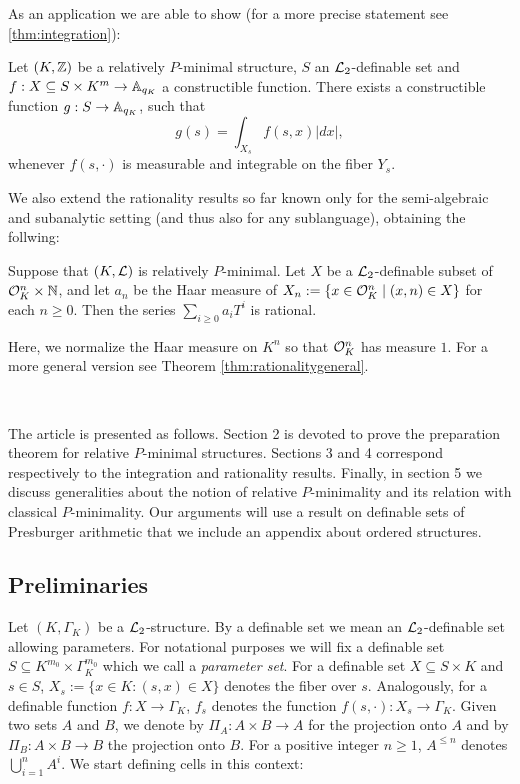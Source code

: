 As an application we are able to show (for a more precise statement see \ref{thm:integration}): 

\begin{thm*}
Let $(K, \Z)$ be a relatively $P$-minimal structure, $S$ an $\Lm_2$-definable set and $f: X \subseteq S\times K^m \to \AA_{q_K}$ a constructible function.  There exists a constructible function $g: S \to \AA_{q_K}$, such that
\[g(s) = \int_{X_s} f(s,x)|dx|,\]
whenever $f(s, \cdot)$ is measurable and integrable on the fiber $Y_s$.
\end{thm*}

We also extend the rationality results so far known only for the semi-algebraic \cite{denef-84} and subanalytic setting \cite{denef-vdd-88} (and thus also for any sublanguage), obtaining the follwing:

\begin{thm}\label{thm:rationality}
Suppose that $(K,\cL)$ is relatively $P$-minimal. Let $X$ be a $\cL_2$-definable subset of $\cO_K^n\times \NN$, and let $a_n$ be the Haar measure of $X_n:=\{x\in \cO_K^n\mid (x,n)\in X\}$ for each $n\geq 0$. Then the series $\sum_{i\geq 0} a_i T^i$ is rational. 
\end{thm}
Here, we normalize the Haar measure on $K^n$ so that $\cO_K^n$ has measure $1$. For a more general version see Theorem \ref{thm:rationalitygeneral}.  

\

The article is presented as follows. Section 2 is devoted to prove the preparation theorem for relative $P$-minimal structures. Sections 3 and 4 correspond respectively to the integration and rationality results. Finally, in section 5 we discuss generalities about the notion of relative $P$-minimality and its relation with classical $P$-minimality. Our arguments will use a result on definable sets of Presburger arithmetic that we include an appendix about ordered structures. 

\subsection{Preliminaries}

Let $(K,\Gamma_K)$ be a $\cL_2$-structure. By a definable set we mean an $\Lm_2$-definable set allowing parameters. For notational purposes we will fix a definable set $S \subseteq K^{m_0} \times \Gamma_K^{m_0}$ which we call a \emph{parameter set}. For a definable set $X\subseteq S\times K$ and $s\in S$, $X_s:=\{x\in K: (s,x)\in X\}$ denotes the fiber over $s$. Analogously, for a definable function $f:X\rightarrow \Gamma_K$, $f_s$ denotes the function $f(s,\cdot):X_s\rightarrow \Gamma_K$. Given two sets $A$ and $B$, we denote by $\Pi_{A}:A\times B\to A$ for the projection onto $A$ and by $\Pi_B:A\times B\to B$ the projection onto $B$. For a positive integer $n\geq 1$, $A^{\leq n}$ denotes $\bigcup_{i=1}^n A^i$. We start defining cells in this context: 

